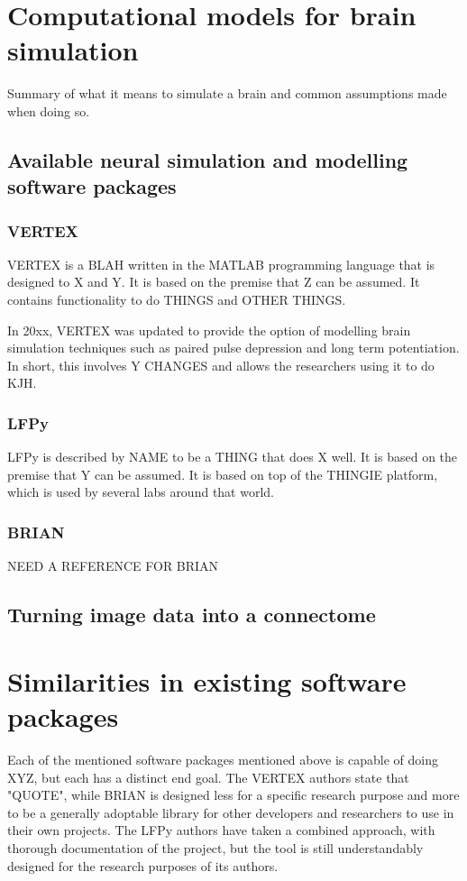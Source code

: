 \section{Computational models for brain simulation}

Summary of what it means to simulate a brain and common assumptions made when
doing so.

\subsection{Available neural simulation and modelling software packages}
\subsubsection{VERTEX}
VERTEX is a BLAH written in the MATLAB programming language that is designed to
X and Y. It is based on the premise that Z can be assumed. It contains
functionality to do THINGS and OTHER THINGS. 

In 20xx, VERTEX was updated to provide the option of modelling brain simulation
techniques such as paired pulse depression and long term potentiation. In short,
this involves Y CHANGES and allows the researchers using it to do KJH.


\autocite{tomsett_virtual_2015} \autocite{thornton_virtual_2019}
\subsubsection{LFPy}
LFPy is described by NAME to be a THING that does X well. It is based on the
premise that Y can be assumed. It is based on top of the THINGIE platform, which
is used by several labs around that world.
\autocite{hagen_lfpy_2019} \autocite{hagen_hybrid_2016}
\subsubsection{BRIAN}
NEED A REFERENCE FOR BRIAN
\subsection{Turning image data into a connectome}

\section{Similarities in existing software packages}

Each of the mentioned software packages mentioned above is capable of doing XYZ,
but each has a distinct end goal. The VERTEX authors state that "QUOTE", while
BRIAN is designed less for a specific research purpose and more to be a
generally adoptable library for other developers and researchers to use in their
own projects. The LFPy authors have taken a combined approach, with thorough
documentation of the project, but the tool is still understandably designed for
the research purposes of its authors.